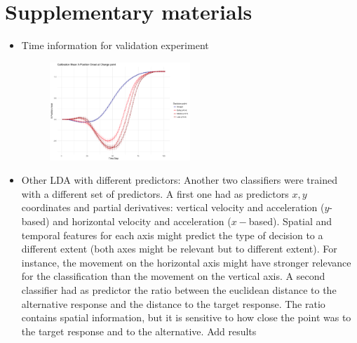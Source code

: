 \documentclass{article}
\newcommand{\addMM}[1]{{\leavevmode\color{red}#1}}
\begin{document}
\section{Supplementary materials}

\begin{itemize}
\item Time information for validation experiment


\begin{figure}
\centering
\includegraphics[width=0.5\textwidth]{calibration_mean_XPosition_time.png}
\caption{}
\end{figure}

\item Other LDA with different predictors: Another two classifiers were trained with a different set of predictors. A first one had as predictors $x,y$ coordinates and partial derivatives: vertical velocity and acceleration ($y$-based) and horizontal velocity and acceleration ($x-$based). 
Spatial and temporal features for each axis might predict the type of decision to a different extent \addMM{(both axes might be relevant but to different extent)}. 
For instance, the movement on the horizontal axis might have stronger relevance for the classification than the movement on the vertical axis.  
A second classifier had as predictor the ratio between the euclidean distance to the alternative response and the distance to the target response. \addMM{The ratio contains spatial information, but it is sensitive to how close the point was to the target response and to the alternative.} \addMM{Add results}


\end{itemize}
\end{document}
